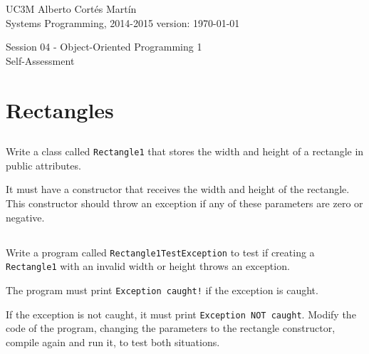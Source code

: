 \documentclass[a4paper, 11pt]{article}
\newcommand{\realtitle}{Session 04 - Object-Oriented Programming 1}
\begin{document}
\makebox[\linewidth]{\rule{\textwidth}{0.4pt}}
UC3M \hfill Alberto Cortés Martín\\
Systems Programming, 2014-2015 \hfill version: \today\\
\makebox[\linewidth]{\rule{\textwidth}{0.4pt}}
\begin{center}
  \Large{\realtitle}\\Self-Assessment
\end{center}
\makebox[\linewidth]{\rule{\textwidth}{0.4pt}}
\vspace{1cm}


\section{Rectangles}

\subsection{}

Write a class called \verb+Rectangle1+ that stores the width and height of a
rectangle in public attributes.

It must have a constructor that receives the width and height of the rectangle.
This constructor should throw an exception if any of these
parameters are zero or negative.



\subsection{}

Write a program called \verb+Rectangle1TestException+ to test if creating a
\verb+Rectangle1+ with an invalid width or height throws an exception.

The program must print \verb+Exception caught!+ if the exception is caught.

If the exception is not caught, it must print \verb+Exception NOT caught+.
Modify the code of the program, changing the parameters to the rectangle
constructor, compile again and run it, to test both situations.





\subsection{}
\end{document}
